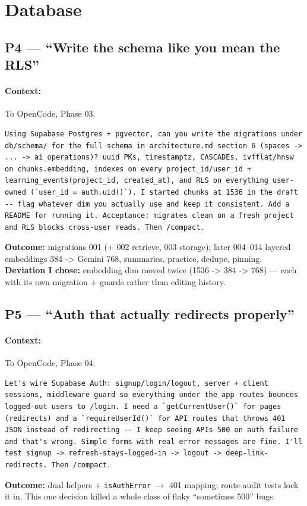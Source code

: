 \documentclass[11pt,a4paper]{article}
\begin{document}
\section{Database}

\subsection{P4 --- ``Write the schema like you mean the RLS''}
\paragraph{Context:} To OpenCode, Phase 03.
\begin{lstlisting}
Using Supabase Postgres + pgvector, can you write the migrations under db/schema/ for the full schema in architecture.md section 6 (spaces -> ... -> ai_operations)? uuid PKs, timestamptz, CASCADEs, ivfflat/hnsw on chunks.embedding, indexes on every project_id/user_id + learning_events(project_id, created_at), and RLS on everything user-owned (`user_id = auth.uid()`). I started chunks at 1536 in the draft -- flag whatever dim you actually use and keep it consistent. Add a README for running it. Acceptance: migrates clean on a fresh project and RLS blocks cross-user reads. Then /compact.
\end{lstlisting}
\textbf{Outcome:} migrations 001 (+ 002 retrieve, 003 storage); later 004--014 layered embeddings 384 -> Gemini 768, summaries, practice, dedupe, pinning.\\
\textbf{Deviation I chose:} embedding dim moved twice (1536 -> 384 -> 768) --- each with its own migration + guards rather than editing history.

\subsection{P5 --- ``Auth that actually redirects properly''}
\paragraph{Context:} To OpenCode, Phase 04.
\begin{lstlisting}
Let's wire Supabase Auth: signup/login/logout, server + client sessions, middleware guard so everything under the app routes bounces logged-out users to /login. I need a `getCurrentUser()` for pages (redirects) and a `requireUserId()` for API routes that throws 401 JSON instead of redirecting -- I keep seeing APIs 500 on auth failure and that's wrong. Simple forms with real error messages are fine. I'll test signup -> refresh-stays-logged-in -> logout -> deep-link-redirects. Then /compact.
\end{lstlisting}
\textbf{Outcome:} dual helpers + \texttt{isAuthError} $\rightarrow$ 401 mapping; route-audit tests lock it in. This one decision killed a whole class of flaky ``sometimes 500'' bugs.
\end{document}
